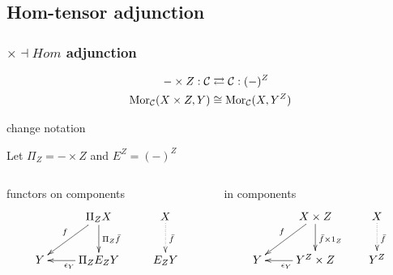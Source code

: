 \subsection{Hom-tensor adjunction}
\begin{frame}[t]
\frametitle{$\times \dashv Hom$ adjunction}
\begin{block}{}
\abovedisplayskip=0pt
\begin{align*}
- \times Z: \mathcal{C} & \rightleftarrows \mathcal{C}: (-)^Z\\
\mathop{\rm Mor}\nolimits_{\mathcal{C}}(X \times Z, Y) & \cong  \mathop{\rm Mor}\nolimits_{\mathcal{C}}(X, Y^Z)
\end{align*}
\end{block}
\begin{block}{change notation}
	\begin{center}
	Let $\Pi_Z = - \times Z$ and $E^Z = (-)^Z$
	\end{center}
\end{block}
\begin{columns}[t]
    \begin{column}{0.5\textwidth}
		\begin{block}{functors on components}
			$$
			\xymatrix{
			& \Pi_Z X \ar[d]^{\Pi_Z \bar{f}} \ar[dl]_{f} & X \ar@{.>}[d]^{\bar{f}}\\
			Y & \Pi_Z E_Z Y \ar[l]^{\epsilon_Y} & E_Z Y}
			$$
		\end{block}		
    \end{column}
    \begin{column}{0.5\textwidth}
		\begin{block}{in components}
			$$
			\xymatrix{
			& X \times Z \ar[d]^{\bar{f} \times 1_Z} \ar[dl]_{f} & X \ar@{.>}[d]^{\bar{f}}\\
			Y & Y^Z \times Z \ar[l]^{\epsilon_Y} & Y^Z}
			$$
		\end{block}
    \end{column}
\end{columns}
\end{frame}

